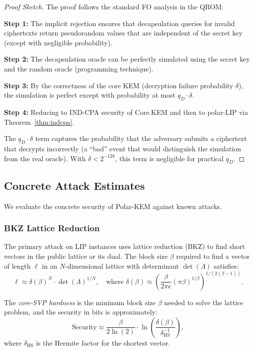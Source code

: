 \documentclass[11pt,a4paper]{article}
\newcommand{\polarKem}{\textsf{Polar-KEM}\xspace}
\newcommand{\CoreKEM}{\textsf{Core.KEM}\xspace}
\newcommand{\lipPrb}{\textsf{LIP}\xspace}
\newcommand{\FO}{\textsf{FO}\xspace}
\newcommand{\polarLIP}{\textsf{polar-LIP}\xspace}
\newcommand{\INDCPA}{\textsf{IND-CPA}\xspace}
\newcommand{\QROM}{\textsf{QROM}\xspace}
\begin{document}
\begin{proof}[Proof Sketch]
The proof follows the standard \FO analysis in the \QROM:

\textbf{Step 1:} The implicit rejection ensures that decapsulation queries for invalid ciphertexts return pseudorandom values that are independent of the secret key (except with negligible probability).

\textbf{Step 2:} The decapsulation oracle can be perfectly simulated using the secret key and the random oracle (programming technique).

\textbf{Step 3:} By the correctness of the core KEM (decryption failure probability $\delta$), the simulation is perfect except with probability at most $q_D \cdot \delta$.

\textbf{Step 4:} Reducing to \INDCPA security of \CoreKEM and then to \polarLIP via Theorem~\ref{thm:indcpa}.

The $q_D \cdot \delta$ term captures the probability that the adversary submits a ciphertext that decrypts incorrectly (a ``bad'' event that would distinguish the simulation from the real oracle). With $\delta < 2^{-128}$, this term is negligible for practical $q_D$.
\end{proof}

\subsection{Concrete Attack Estimates}\label{sec:attack-estimates}

We evaluate the concrete security of \polarKem against known attacks.

\subsubsection{BKZ Lattice Reduction}

The primary attack on \lipPrb instances uses lattice reduction (BKZ) to find short vectors in the public lattice or its dual. The block size $\beta$ required to find a vector of length $\ell$ in an $N$-dimensional lattice with determinant $\det(\Lambda)$ satisfies:
\[
\ell \approx \delta(\beta)^N \cdot \det(\Lambda)^{1/N}, \quad \text{where } \delta(\beta) \approx \left(\frac{\beta}{2\pi e}(\pi \beta)^{1/\beta}\right)^{1/(2(\beta-1))}.
\]

The \emph{core-SVP hardness} is the minimum block size $\beta$ needed to solve the lattice problem, and the security in bits is approximately:
\[
\text{Security} \approx \frac{\beta}{2 \ln(2)} \cdot \ln\left(\frac{\delta(\beta)}{\delta_{\text{HS}}^{-1}}\right),
\]
where $\delta_{\text{HS}}$ is the Hermite factor for the shortest vector.
\end{document}
